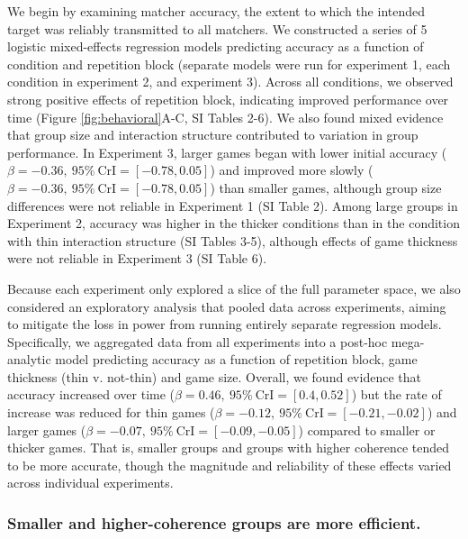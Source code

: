 \documentclass[
  english,
]{article}
\begin{document}
We begin by examining matcher accuracy, the extent to which the intended target was reliably transmitted to all matchers.
We constructed a series of 5 logistic mixed-effects regression models predicting accuracy as a function of condition and repetition block (separate models were run for experiment 1, each condition in experiment 2, and experiment 3).
Across all conditions, we observed strong positive effects of repetition block, indicating improved performance over time (Figure \ref{fig:behavioral}A-C, SI Tables 2-6).
We also found mixed evidence that group size and interaction structure contributed to variation in group performance.
In Experiment 3, larger games began with lower initial accuracy (\(\beta=-0.36,\:95\%\:\mathrm{CrI}=[-0.78, 0.05]\)) and improved more slowly (\(\beta=-0.36,\:95\%\:\mathrm{CrI}=[-0.78, 0.05]\)) than smaller games, although group size differences were not reliable in Experiment 1 (SI Table 2).
Among large groups in Experiment 2, accuracy was higher in the thicker conditions than in the condition with thin interaction structure (SI Tables 3-5), although effects of game thickness were not reliable in Experiment 3 (SI Table 6).

Because each experiment only explored a slice of the full parameter space, we also considered an exploratory analysis that pooled data across experiments, aiming to mitigate the loss in power from running entirely separate regression models.
Specifically, we aggregated data from all experiments into a post-hoc mega-analytic model predicting accuracy as a function of repetition block, game thickness (thin v. not-thin) and game size.
Overall, we found evidence that accuracy increased over time (\(\beta=0.46,\:95\%\:\mathrm{CrI}=[0.4, 0.52]\)) but the rate of increase was reduced for thin games (\(\beta=-0.12,\:95\%\:\mathrm{CrI}=[-0.21, -0.02]\)) and larger games (\(\beta=-0.07,\:95\%\:\mathrm{CrI}=[-0.09, -0.05]\)) compared to smaller or thicker games.
That is, smaller groups and groups with higher coherence tended to be more accurate, though the magnitude and reliability of these effects varied across individual experiments.

\hypertarget{smaller-and-higher-coherence-groups-are-more-efficient.}{%
\subsubsection{Smaller and higher-coherence groups are more efficient.}\label{smaller-and-higher-coherence-groups-are-more-efficient.}}
\end{document}
